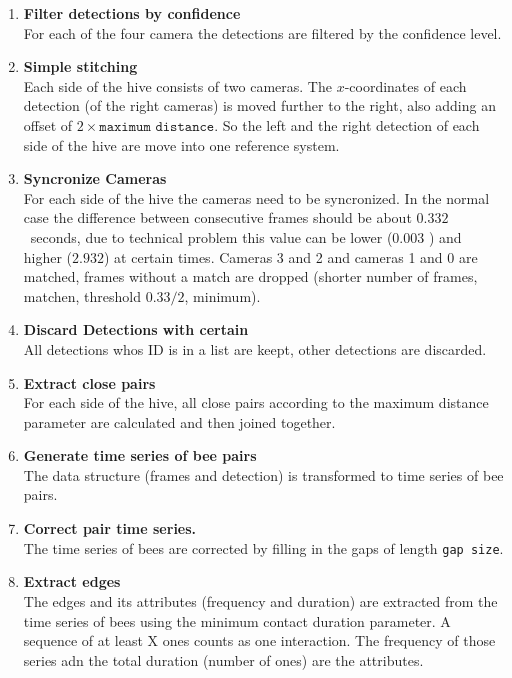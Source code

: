 \begin{enumerate}
\item \textbf{Filter detections by confidence}\\
For each of the four camera the detections are filtered by the confidence level.

\item \textbf{Simple stitching}\\
Each side of the hive consists of two cameras. 	The $x$-coordinates of each detection (of the right	cameras) is moved further to the right, also adding an offset of $2\times \texttt{maximum distance}$. So the left and the right detection of each side of the hive are move into one reference system.

\item \textbf{Syncronize Cameras}\\
For each side of the hive the cameras need to be syncronized. In the normal case the difference between consecutive frames should be about $0.332$~seconds, due to technical problem this value can be lower ($0.003$ ) and higher ($2.932$) at certain times. Cameras 3 and 2 and cameras 1 and 0 are matched, frames without a match are dropped (shorter number of frames, matchen, threshold $0.33/2$, minimum).

\item \textbf{Discard Detections with certain}\\
All detections whos ID is in a list are keept, other detections are discarded.

\item \textbf{Extract close pairs}\\
For each side of the hive, all close pairs according to the maximum distance parameter are calculated and then joined together.

\item \textbf{Generate time series of bee pairs}\\
The data structure (frames and detection) is transformed to time series of bee pairs.

\item \textbf{Correct pair time series.}\\
The time series of bees are corrected by filling in the gaps of length \texttt{gap size}.

\item \textbf{Extract edges}\\
The edges and its attributes (frequency and duration) are extracted from the time series of bees using the minimum contact duration parameter. A sequence of at least X ones counts as one interaction. The frequency of those series adn the total duration (number of ones) are the attributes.


\end{enumerate}

